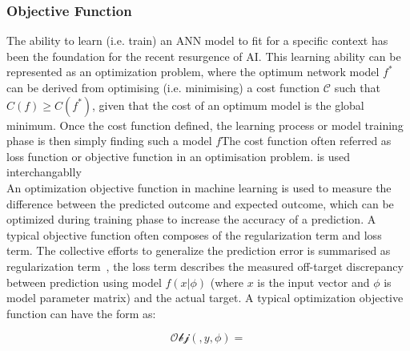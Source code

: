 \subsubsection{Objective Function}
The ability to learn (i.e. train) an ANN model to fit for a specific context has been the foundation for the recent resurgence of AI. This learning ability can be represented as an optimization problem, where the optimum network model $f^*$ can be derived from optimising (i.e. minimising) a cost function $\mathcal{C}$ such that $C(f) \geq C(f^*)$, given that the cost of an optimum model is the global minimum. Once the cost function defined, the learning process or model training phase is then simply finding such a model $f$The cost function often referred as loss function or objective function in an optimisation problem. is used interchangablly 
\\
An optimization objective function in machine learning is used to measure the difference between the predicted outcome and expected outcome, which can be optimized during training phase to increase the accuracy of a prediction. A typical objective function often composes of the regularization term and loss term. The collective efforts to generalize the prediction error is summarised as regularization term~\cite{goodfellow_2015}, the loss term describes the measured off-target discrepancy between prediction using model $f(x|\phi)$ (where $x$ is the input vector and $\phi$ is model parameter matrix) and the actual target. A typical optimization objective function can have the form as:

\begin{equation}
    \mathcal{Obj}(,y,\phi) = 
\end{equation}